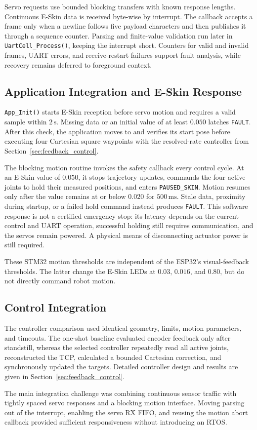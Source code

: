 Servo requests use bounded blocking transfers with known response lengths.
Continuous E-Skin data is received byte-wise by interrupt. The callback accepts
a frame only when a newline follows five payload characters and then publishes
it through a sequence counter. Parsing and finite-value validation run later in
\texttt{UartCell\_Process()}, keeping the interrupt short. Counters for valid
and invalid frames, UART errors, and receive-restart failures support fault
analysis, while recovery remains deferred to foreground context.

\subsection{Application Integration and E-Skin Response}

\texttt{App\_Init()} starts E-Skin reception before servo motion and requires a
valid sample within \(2\,\mathrm{s}\). Missing data or an initial value of at
least \(0.050\) latches \texttt{FAULT}. After this check, the application moves
to and verifies its start pose before executing four Cartesian square
waypoints with the resolved-rate controller from
Section~\ref{sec:feedback_control}.

The blocking motion routine invokes the safety callback every control cycle.
At an E-Skin value of \(0.050\), it stops trajectory updates, commands the four
active joints to hold their measured positions, and enters
\texttt{PAUSED\_SKIN}. Motion resumes only after the value remains at or below
\(0.020\) for \(500\,\mathrm{ms}\). Stale data, proximity during startup, or
a failed hold command instead produces \texttt{FAULT}. This software response
is not a certified emergency stop: its latency depends on the current control
and UART operation, successful holding still requires communication, and the
servos remain powered. A physical means of disconnecting actuator power is
still required.

These STM32 motion thresholds are independent of the ESP32's visual-feedback
thresholds. The latter change the E-Skin LEDs at \(0.03\), \(0.016\), and
\(0.80\), but do not directly command robot motion.

\subsection{Control Integration}

The controller comparison used identical geometry, limits, motion parameters,
and timeouts. The one-shot baseline evaluated encoder feedback only after
standstill, whereas the selected controller repeatedly read all active joints,
reconstructed the TCP, calculated a bounded Cartesian correction, and
synchronously updated the targets. Detailed controller design and results are
given in Section~\ref{sec:feedback_control}.

The main integration challenge was combining continuous sensor traffic with
tightly spaced servo responses and a blocking motion interface. Moving parsing
out of the interrupt, enabling the servo RX FIFO, and reusing the motion abort
callback provided sufficient responsiveness without introducing an RTOS.
